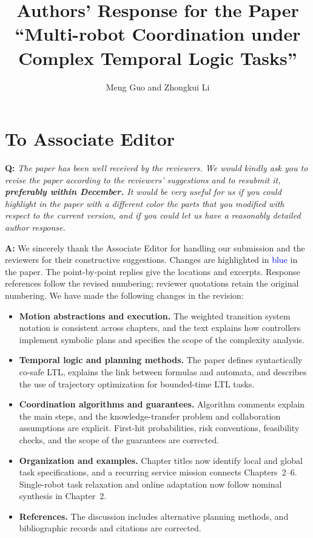 \documentclass[11pt]{article}
\begin{document}
\title{Authors' Response for the Paper\\
``Multi-robot Coordination under\\Complex Temporal Logic Tasks''}
\author{Meng Guo and Zhongkui Li}
\date{}
\maketitle


\section*{To Associate Editor}
\begin{shaded*}
\noindent\textbf{Q:} \emph{The paper has been well received by the reviewers.
We would kindly ask you to revise the paper according to the reviewers' suggestions
and to resubmit it, \textbf{preferably within December.}
It would be very useful for us if you could highlight in the paper with a different
color the parts that you modified with respect to the current version, and if you
could let us have a reasonably detailed author response.}
\end{shaded*}

\noindent\textbf{A:} We sincerely thank the Associate Editor for handling our
submission and the reviewers for their constructive suggestions. Changes are
highlighted in \textcolor{blue}{blue} in the paper.
The point-by-point replies give the locations and excerpts.
Response references follow the revised numbering; reviewer quotations retain
the original numbering.
We have made the following changes in the revision:

\begin{itemize}
\setlength{\itemsep}{3pt}
\setlength{\parsep}{0pt}
\item \textbf{Motion abstractions and execution.} The weighted transition
system notation is consistent across chapters, and the text explains how controllers
implement symbolic plans and specifies the scope of the complexity analysis.

\item \textbf{Temporal logic and planning methods.} The paper defines syntactically
co-safe LTL, explains the link between formulas and automata, and describes
the use of trajectory optimization for bounded-time LTL tasks.

\item \textbf{Coordination algorithms and guarantees.} Algorithm comments explain the main
steps, and the knowledge-transfer problem
and collaboration assumptions are explicit. First-hit probabilities, risk
conventions, feasibility checks, and the scope of the guarantees are corrected.

\item \textbf{Organization and examples.} Chapter titles now identify local and
global task specifications, and a recurring service mission connects Chapters~2--6.
Single-robot task relaxation and online adaptation now follow nominal
synthesis in Chapter~2.

\item \textbf{References.} The discussion includes alternative planning
methods, and bibliographic records and citations are corrected.
\end{itemize}
\end{document}
